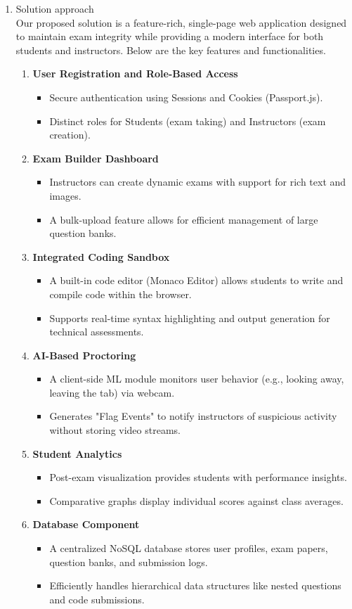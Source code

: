 \documentclass[14pt]{article}
\begin{document}
\begin{enumerate}
\item Solution approach \\
\tabto{.5cm}Our proposed solution is a feature-rich, single-page web application designed to maintain exam integrity while providing a modern interface for both students and instructors. Below are the key features and functionalities.
\begin{enumerate}
\item \textbf{User Registration and Role-Based Access}
\begin{itemize}
\item Secure authentication using Sessions and Cookies (Passport.js).
\item Distinct roles for Students (exam taking) and Instructors (exam creation).
\end{itemize}
\item \textbf{Exam Builder Dashboard}
\begin{itemize}
\item Instructors can create dynamic exams with support for rich text and images.
\item A bulk-upload feature allows for efficient management of large question banks.
\end{itemize}
\item \textbf{Integrated Coding Sandbox}
\begin{itemize}
\item A built-in code editor (Monaco Editor) allows students to write and compile code within the browser.
\item Supports real-time syntax highlighting and output generation for technical assessments.
\end{itemize}
\item \textbf{AI-Based Proctoring}
\begin{itemize}
\item A client-side ML module monitors user behavior (e.g., looking away, leaving the tab) via webcam.
\item Generates "Flag Events" to notify instructors of suspicious activity without storing video streams.
\end{itemize}
\item \textbf{Student Analytics}
\begin{itemize}
\item Post-exam visualization provides students with performance insights.
\item Comparative graphs display individual scores against class averages.
\end{itemize}
\item \textbf{Database Component}
\begin{itemize}
\item A centralized NoSQL database stores user profiles, exam papers, question banks, and submission logs.
\item Efficiently handles hierarchical data structures like nested questions and code submissions.
\end{itemize}
\end{enumerate}


\end{enumerate}
\end{document}
